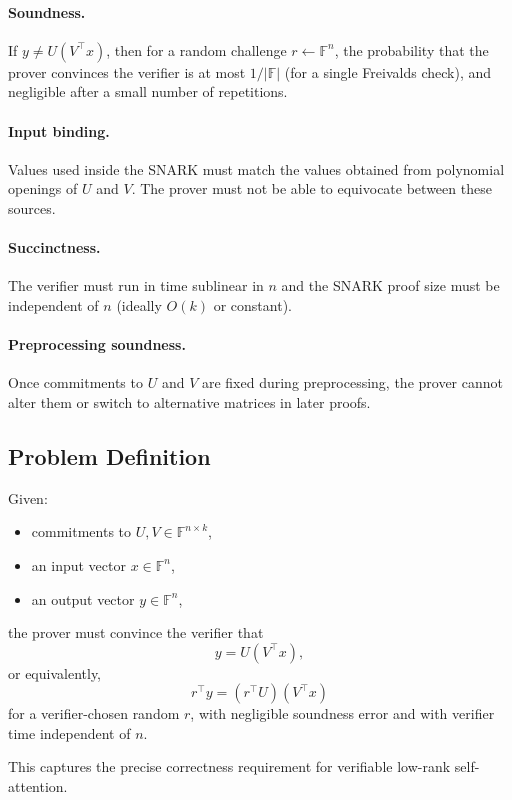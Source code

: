 \documentclass[11pt]{article}
\begin{document}
\paragraph{Soundness.}
If $y \neq U(V^\top x)$, then for a random challenge
$r \leftarrow \mathbb{F}^n$, the probability that the prover convinces
the verifier is at most $1/|\mathbb{F}|$ (for a single Freivalds check),
and negligible after a small number of repetitions.

\paragraph{Input binding.}
Values used inside the SNARK must match the values obtained from
polynomial openings of $U$ and $V$.
The prover must not be able to equivocate between these sources.

\paragraph{Succinctness.}
The verifier must run in time sublinear in $n$ and the SNARK proof size
must be independent of $n$ (ideally $O(k)$ or constant).

\paragraph{Preprocessing soundness.}
Once commitments to $U$ and $V$ are fixed during preprocessing, the
prover cannot alter them or switch to alternative matrices in later
proofs.

\subsection{Problem Definition}

Given:
\begin{itemize}
  \item commitments to $U, V \in \mathbb{F}^{n \times k}$,
  \item an input vector $x \in \mathbb{F}^n$,
  \item an output vector $y \in \mathbb{F}^n$,
\end{itemize}
the prover must convince the verifier that
\[
  y = U (V^\top x),
\]
or equivalently,
\[
  r^\top y = (r^\top U)(V^\top x)
\]
for a verifier-chosen random $r$,
with negligible soundness error and with verifier time independent of
$n$.

This captures the precise correctness requirement for verifiable
low-rank self-attention.
\end{document}
